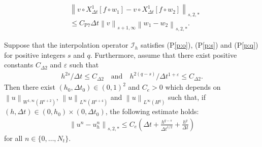 \documentclass[10pt,a4paper]{amsart}
\def\norm#1#2{\left\|#2\right\|_{#1}}
\begin{document}
  \begin{align}
    & \norm{s, 2, \ast}{v \circ {X_{\Delta t}^1} [f \circ w_1] - v \circ {X_{\Delta t}^1} [f \circ w_2]} \\ & \leq C_{\mathrm{P}7} \Delta t \norm{s + 1, \infty}{v} \norm{s, 2, \ast}{w_1 - w_2}. \label{d4} 
  \end{align} 

\begin{theorem} \label{thm:1} 
  Suppose that the interpolation operator $ \mathcal{I}_{h} $ satisfies (P\ref{p:o}), (P\ref{p:s}) and (P\ref{p:q}) for positive integers $ s $ and $ q $. Furthermore, assume that there exist positive constants $ C_{\Delta 2} $ and $ \varepsilon $ such that 
  \begin{align} 
    h^{2s} / \Delta t \leq C_{\Delta 2} \quad \text{and} \quad h^{2(q - s)} / \Delta t^{1 + \varepsilon} \leq C_{\Delta 2}. \label{hyp:delta} 
  \end{align} 
  Then there exist $ (h_0, \Delta t_0) \in (0, 1)^2 $ and $ C_e > 0 $ which depends on $ \norm{W^{1,\infty}(H^{s + 2})}{u} $, $ \norm{L^{\infty} (H^{s + 4})}{u} $ and $ \norm{L^{\infty}(H^{q})}{u} $ such that, if $ (h, \Delta t) \in (0, h_0) \times (0, \Delta t_0) $, the following estimate holds: 
  \begin{align} 
    \norm{s, 2, \ast}{u^n - u_h^n} \leq C_e \left(\Delta t + \frac{h^{q - s}}{\Delta t^{1/2}} + \frac{h^q}{\Delta t}\right) \label{b30} 
  \end{align} 
  for all $ n \in \{0, \ldots, N_t\} $. 
\end{theorem} 
\end{document}
